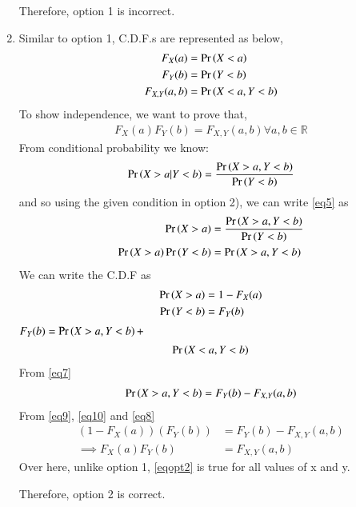 \documentclass[journal,12pt,twocolumn]{IEEEtran}
\begin{document}
\begin{enumerate}
Therefore, option 1 is incorrect.
    
\item Similar to option 1, C.D.F.s are represented as below,\\
\begin{align}
    F_X(a) &= \Pr\left(X < a\right)\\
    F_Y(b) &= \Pr\left(Y < b\right)\\
    F_{X,Y}(a,b) &= \Pr\left(X < a, Y < b\right)\label{eq7}
\end{align}
To show independence, we want to prove that,
\begin{align}
    F_X(a)F_Y(b) = F_{X, Y}(a,b) \forall a, b \in \mathbb{R}\label{eq5}
\end{align}
From conditional probability we know: 
\begin{align}
    \Pr\left(X > a | Y < b\right) = \frac{\Pr\left(X > a, Y < b\right)}{\Pr\left(Y < b\right)}
\end{align}
and so using the given condition in option 2), we can write \eqref{eq5} as
\begin{align}
    \Pr\left(X > a\right) &= \frac{\Pr\left(X > a, Y < b\right)}{\Pr\left(Y < b\right)}\\
    \Pr\left(X > a\right)\Pr\left(Y < b\right) &= \Pr\left(X > a, Y < b\right)\label{eq6}
\end{align}
We can write the C.D.F as 
\begin{align}
    \Pr\left(X > a\right) &= 1 - F_X(a)\label{eq9}\\
    \Pr\left(Y < b\right) &= F_Y(b)\label{eq10}\\
\end{align}
\begin{math}
    F_Y(b) = \Pr\left(X > a, Y < b\right) +
\end{math}
\begin{align}
    \Pr\left(X < a, Y < b\right)
\end{align}
From \eqref{eq7}
\begin{align}
    \Pr\left(X > a, Y < b\right) = F_Y(b) - F_{X, Y}(a,b)\label{eq8}
\end{align}
From \eqref{eq9}, \eqref{eq10} and \eqref{eq8}
\begin{align}
    (1 - F_X(a))(F_Y(b)) &= F_Y(b) - F_{X, Y}(a,b)\\
    \implies F_X(a)F_Y(b) &= F_{X, Y}(a,b)\label{eqopt2}
\end{align}
Over here, unlike option 1, \eqref{eqopt2} is true for all values of x and y.

Therefore, option 2 is correct.


\end{enumerate}
\end{document}
